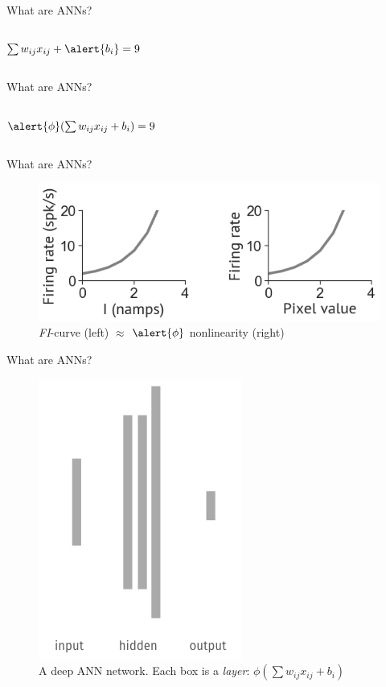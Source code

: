 \documentclass[10pt]{beamer}
\begin{document}
\begin{frame}[fragile]{What are ANNs?}
\begin{columns}
\centering
\centering
 $\sum w_{ij} x_{ij} + \alert{b_i} = 9$
\end{columns}
\end{frame}

\begin{frame}[fragile]{What are ANNs?}
\begin{columns}
\centering
\centering
 $\alert{\phi}(\sum w_{ij} x_{ij} + b_i) = 9$
\end{columns}
\end{frame}

\begin{frame}[fragile]{What are ANNs?}
\begin{figure}
    \centering
    \includegraphics[scale=0.4]{images/phi.png}
    \caption{\textit{FI}-curve (left) $\approx$ $\alert{\phi}$ nonlinearity (right)}
\end{figure}
\end{frame}

\begin{frame}[fragile]{What are ANNs?}
\begin{figure}
    \centering
    \includegraphics[scale=0.4]{images/deep.png}
    \caption{
    \alert{A deep ANN network}. Each box is a \textit{layer}: $\phi (\sum w_{ij} x_{ij} + b_i)$
    }
\end{figure}
\end{frame}
\end{document}
